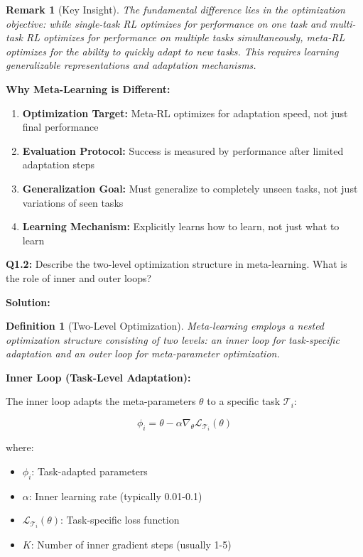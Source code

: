 \documentclass[12pt]{article}
\newcommand{\ieee}[1]{\textcolor{IEEEBlue}{\textbf{#1}}}
\newtheorem{definition}{Definition}
\newtheorem{remark}{Remark}
\begin{document}
{{			\begin{remark}[Key Insight]
			The fundamental difference lies in the optimization objective: while single-task RL optimizes for performance on one task and multi-task RL optimizes for performance on multiple tasks simultaneously, meta-RL optimizes for the ability to quickly adapt to new tasks. This requires learning generalizable representations and adaptation mechanisms.
			\end{remark}
			
			\ieee{Why Meta-Learning is Different:}
			
			\begin{enumerate}
				\item \textbf{Optimization Target:} Meta-RL optimizes for adaptation speed, not just final performance
				\item \textbf{Evaluation Protocol:} Success is measured by performance after limited adaptation steps
				\item \textbf{Generalization Goal:} Must generalize to completely unseen tasks, not just variations of seen tasks
				\item \textbf{Learning Mechanism:} Explicitly learns how to learn, not just what to learn
			\end{enumerate}
			
			\textbf{Q1.2:} Describe the two-level optimization structure in meta-learning. What is the role of inner and outer loops?
			
			\textbf{Solution:}
			
			\begin{definition}[Two-Level Optimization]
			Meta-learning employs a nested optimization structure consisting of two levels: an inner loop for task-specific adaptation and an outer loop for meta-parameter optimization.
			\end{definition}
			
			\ieee{Inner Loop (Task-Level Adaptation):}
			
			The inner loop adapts the meta-parameters $\theta$ to a specific task $\mathcal{T}_i$:
			
			\begin{equation}
			\phi_i = \theta - \alpha \nabla_\theta \mathcal{L}_{\mathcal{T}_i}(\theta)
			\end{equation}
			
			where:
			\begin{itemize}
				\item $\phi_i$: Task-adapted parameters
				\item $\alpha$: Inner learning rate (typically 0.01-0.1)
				\item $\mathcal{L}_{\mathcal{T}_i}(\theta)$: Task-specific loss function
				\item $K$: Number of inner gradient steps (usually 1-5)
			\end{itemize}
			
}}
\end{document}
